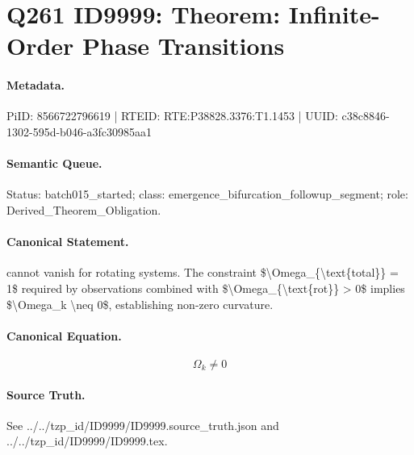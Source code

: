\section*{Q261 ID9999: Theorem: Infinite-Order Phase Transitions}
\paragraph{Metadata.}
PiID: 8566722796619 | RTEID: RTE:P38828.3376:T1.1453 | UUID: c38c8846-1302-595d-b046-a3fc30985aa1

\paragraph{Semantic Queue.}
Status: batch015\_started; class: emergence\_bifurcation\_followup\_segment; role: Derived\_Theorem\_Obligation.

\paragraph{Canonical Statement.}
cannot vanish for rotating systems. The constraint \$\textbackslash{}Omega\_\{\textbackslash{}text\{total\}\} = 1\$ required by observations combined with \$\textbackslash{}Omega\_\{\textbackslash{}text\{rot\}\} > 0\$ implies \$\textbackslash{}Omega\_k \textbackslash{}neq 0\$, establishing non-zero curvature.

\paragraph{Canonical Equation.}
\[
\Omega_k \neq 0
\]

\paragraph{Source Truth.}
See ../../tzp\_id/ID9999/ID9999.source\_truth.json and ../../tzp\_id/ID9999/ID9999.tex.
